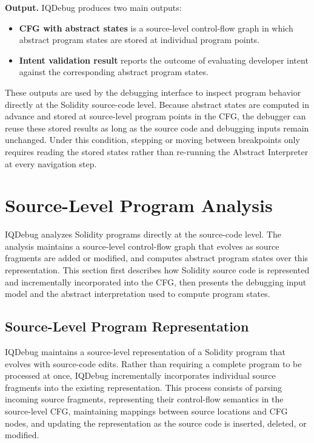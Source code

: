 \documentclass[11pt,oneside]{report}
\theoremstyle{plain}
\theoremstyle{definition}
\theoremstyle{remark}
\begin{document}
\smallskip
\noindent\textbf{Output.}
IQDebug produces two main outputs:

\begin{itemize}
    \item \textbf{CFG with abstract states} is a source-level control-flow graph in which abstract program states are stored at individual program points.
    \item \textbf{Intent validation result} reports the outcome of evaluating developer intent against the corresponding abstract program states.
\end{itemize}

These outputs are used by the debugging interface to inspect program behavior directly at the Solidity source-code level.
Because abstract states are computed in advance and stored at source-level program points in the CFG, the debugger can reuse these stored results as long as the source code and debugging inputs remain unchanged.
Under this condition, stepping or moving between breakpoints only requires reading the stored states rather than re-running the Abstract Interpreter at every navigation step.

\section{Source-Level Program Analysis}\label{sec:design:analysis}
IQDebug analyzes Solidity programs directly at the source-code level.
The analysis maintains a source-level control-flow graph that evolves as source fragments are added or modified, and computes abstract program states over this representation.
This section first describes how Solidity source code is represented and incrementally incorporated into the CFG, then presents the debugging input model and the abstract interpretation used to compute program states.

\subsection{Source-Level Program Representation}\label{subsec:design:representation}
IQDebug maintains a source-level representation of a Solidity program that evolves with source-code edits.
Rather than requiring a complete program to be processed at once, IQDebug incrementally incorporates individual source fragments into the existing representation.
This process consists of parsing incoming source fragments, representing their control-flow semantics in the source-level CFG, maintaining mappings between source locations and CFG nodes, and updating the representation as the source code is inserted, deleted, or modified.
\end{document}
